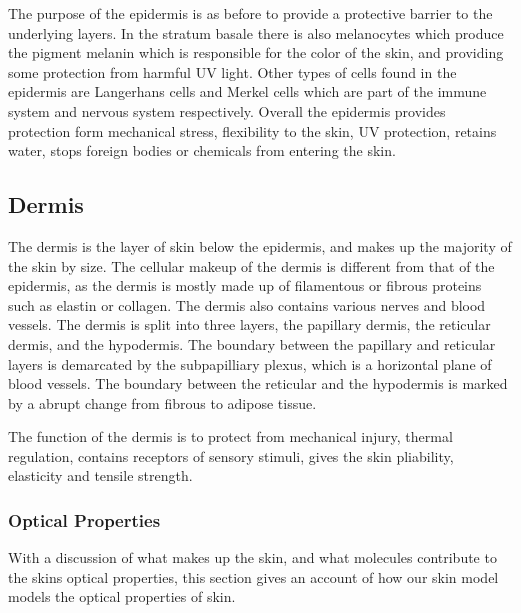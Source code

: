 The purpose of the epidermis is as before to provide a protective barrier to the underlying layers. 
In the stratum basale there is also melanocytes which produce the pigment melanin which is responsible for the color of the skin, and providing some protection from harmful UV light. 
Other types of cells found in the epidermis are Langerhans cells and Merkel cells which are part of the immune system and nervous system respectively.
Overall the epidermis provides protection form mechanical stress, flexibility to the skin, UV protection, retains water, stops foreign bodies or chemicals from entering the skin.


\subsection*{Dermis} %
\label{sub:dermis}
The dermis is the layer of skin below the epidermis, and makes up the majority of the skin by size.
The cellular makeup of the dermis is different from that of the epidermis, as the dermis is mostly made up of filamentous or fibrous proteins such as elastin or collagen.
The dermis also contains various nerves and blood vessels.
The dermis is split into three layers, the papillary dermis, the reticular dermis, and the hypodermis.
The boundary between the papillary and reticular layers is demarcated by the subpapilliary plexus, which is a horizontal plane of blood vessels.
The boundary between the reticular and the hypodermis is marked by a abrupt change from fibrous to adipose tissue.

The function of the dermis is to protect from mechanical injury, thermal regulation, contains receptors of sensory stimuli, gives the skin pliability, elasticity and tensile strength.
 


\subsubsection*{Optical Properties} %
\label{sub:optical_properties}



With a discussion of what makes up the skin, and what molecules contribute to the skins optical properties, this section gives an account of how our skin model models the optical properties of skin.

